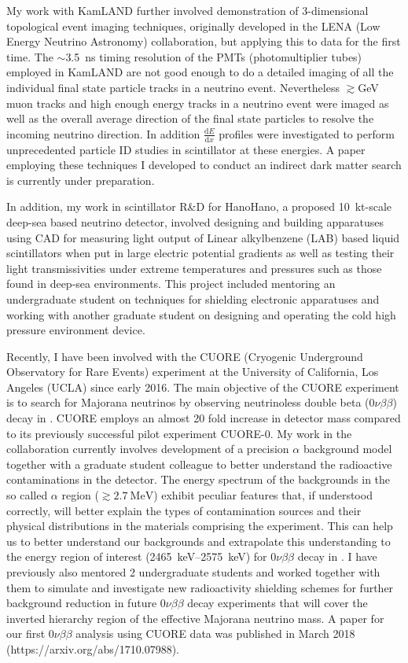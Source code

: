 \documentclass[10pt]{article} %
\begin{document}
My work with KamLAND further involved demonstration of 3-dimensional
topological event imaging techniques, originally developed in the LENA (Low
Energy Neutrino Astronomy) collaboration, but applying this to data for the
first time. The $\sim$\SI{3.5}{\nano\second} timing resolution of the PMTs
(photomultiplier tubes) employed in KamLAND are not good enough to do a
detailed imaging of all the individual final state particle tracks in a
neutrino event. Nevertheless $\gtrsim$\si{\giga\electronvolt} muon tracks and
high enough energy tracks in a neutrino event were imaged as well as the
overall average direction of the final state particles to resolve the incoming
neutrino direction. In addition $\frac{\mathrm{d}E}{\mathrm{d}x}$ profiles were
investigated to perform unprecedented particle ID studies in scintillator at
these energies. A paper employing these techniques I developed to conduct an
indirect dark matter search is currently under preparation.

In addition, my work in scintillator R\&D for HanoHano, a proposed
\SI{10}{\kilo\tonne}-scale deep-sea based neutrino detector, involved designing
and building apparatuses using CAD for measuring light output of Linear
alkylbenzene (LAB) based liquid scintillators when put in large electric
potential gradients as well as testing their light transmissivities under
extreme temperatures and pressures such as those found in deep-sea
environments. This project included mentoring an undergraduate student on
techniques for shielding electronic apparatuses and working with another
graduate student on designing and operating the cold high pressure environment
device.

Recently, I have been involved with the CUORE (Cryogenic Underground
Observatory for Rare Events) experiment at the University of California, Los
Angeles (UCLA) since early 2016. The main objective of the CUORE experiment is
to search for Majorana neutrinos by observing neutrinoless double beta
($0\nu\beta\beta$) decay in . CUORE employs an almost 20 fold
increase in detector mass compared to its previously successful pilot
experiment CUORE-0. My work in the collaboration currently involves development
of a precision $\alpha$ background model together with a graduate student
colleague to better understand the radioactive contaminations in the detector.
The energy spectrum of the backgrounds in the so called $\alpha$ region
($\gtrsim \SI{2.7}{\mega\electronvolt}$) exhibit peculiar features that, if
understood correctly, will better explain the types of contamination sources
and their physical distributions in the materials comprising the experiment.
This can help us to better understand our backgrounds and extrapolate this
understanding to the energy region of interest
(\SIrange{2465}{2575}{\kilo\electronvolt}) for $0\nu\beta\beta$ decay in
. I have previously also mentored 2 undergraduate students and
worked together with them to simulate and investigate new radioactivity
shielding schemes for further background reduction in future $0\nu\beta\beta$
decay experiments that will cover the inverted hierarchy region of the
effective Majorana neutrino mass. A paper for our first $0\nu\beta\beta$
analysis using CUORE data was published in March 2018
(https://arxiv.org/abs/1710.07988).
\end{document}
